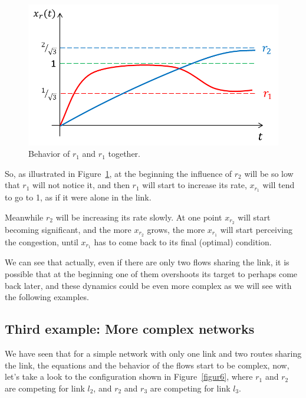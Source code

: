 \begin{figure}[h!]
\centering
\includegraphics[scale=.6]{r1Andr2Together}
\caption{Behavior of $r_1$ and $r_1$ together.}
\label{figur5}
\end{figure}

So, as illustrated in Figure~\ref{figur5}, at the beginning the influence of $r_2$ will be so low that $r_1$ will not notice it, and then $r_1$ will start to increase its rate, $x_{r_1}$ will tend to go to 1, as if it were alone in the link.

Meanwhile $r_2$ will be increasing its rate slowly. At one point $x_{r_2}$ will start becoming significant, and the more $x_{r_2}$ grows, the more $x_{r_1}$ will start perceiving the congestion, until $x_{r_1}$ has to come back to its final (optimal) condition.

We can see that actually, even if there are only two flows sharing the link, it is possible that at the beginning one of them overshoots its target to perhaps come back later, and these dynamics could be even more complex as we will see with the following examples.

\subsection{Third example: More complex networks}

We have seen that for a simple network with only one link and two routes sharing the link, the equations and the behavior of the flows start to be complex, now, let's take a look to the configuration shown in Figure~\ref{figur6}, where $r_1$ and $r_2$ are competing for link $l_2$, and $r_2$ and $r_3$ are competing for link $l_3$.

